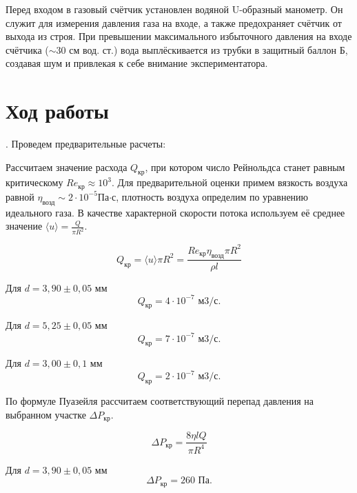 \documentclass[a4paper,12pt]{article} %
\begin{document}
\medskip

\noindent Перед входом в газовый счётчик установлен водяной U-образный манометр. Он служит для измерения давления газа на входе, а также предохраняет счётчик от выхода из строя. При превышении максимального избыточного давления на входе счётчика ($\sim 30$ см вод. ст.) вода выплёскивается из трубки в защитный баллон Б, создавая шум и привлекая к себе внимание экспериментатора.

\medskip

\section{Ход работы}

\medskip

. Проведем предварительные расчеты:

\medskip

 Рассчитаем значение расхода $Q_\text{кр} $, при котором число Рейнольдса станет равным критическому $ Re_\text{кр} \approx 10^3 $. Для предварительной оценки примем вязкость воздуха равной $\eta_\text{возд} \sim 2 \cdot 10^{-5} \text{Па·с} $, плотность воздуха определим по уравнению идеального газа. В качестве характерной скорости потока используем её среднее значение $\langle u \rangle = \frac{Q}{\pi R^2} $.
	
	$$ Q_\text{кр} = \langle u \rangle \pi R^2 = \frac{Re_\text{кр} \eta_\text{возд} \pi R^2}{\rho l} $$
	
\medskip
	
\noindent Для $d = 3,90 \pm 0,05 \text{ мм}$ $$Q_\text{кр} = 4 \cdot 10^{-7} \text{ м3/с.}$$

\medskip

\noindent Для $d = 5,25 \pm 0,05 \text{ мм}$ $$Q_\text{кр} = 7 \cdot 10^{-7} \text{ м3/с.}$$

\medskip

\noindent Для $d = 3,00 \pm 0,1 \text{ мм}$ $$Q_\text{кр} = 2 \cdot 10^{-7} \text{ м3/с.}$$

\medskip
	
  По формуле Пуазейля рассчитаем соответствующий перепад давления на выбранном участке $ \Delta P_\text{кр} $. 
	
\medskip
	
	$$ \Delta P_\text{кр} = \frac{8 \eta l Q}{\pi R^4}$$
	
\medskip
	
\noindent Для $d = 3,90 \pm 0,05 \text{ мм}$ $$\Delta P_\text{кр} = 260 \text{ Па.}$$
\end{document}
